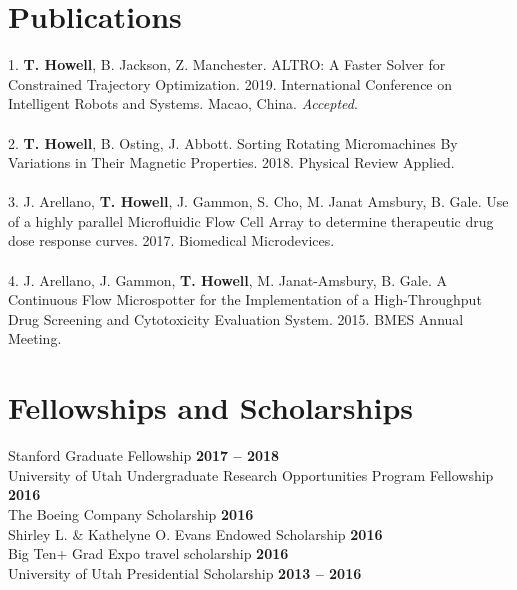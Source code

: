 \documentclass[margin,line]{res}
\begin{document}
\begin{resume}
\section{\sc Publications}
1. \textbf{T. Howell}, B. Jackson, Z. Manchester. ALTRO: A Faster Solver for Constrained Trajectory Optimization. 2019. International Conference on Intelligent Robots and Systems. Macao, China. \textit{Accepted}.\\
\\
2. \textbf{T. Howell}, B. Osting, J. Abbott. Sorting Rotating Micromachines By Variations in Their Magnetic
Properties. 2018. Physical Review Applied.\\
\\
3. J. Arellano, \textbf{T. Howell}, J. Gammon, S. Cho, M. Janat Amsbury, B. Gale. Use of a highly parallel
Microfluidic Flow Cell Array to determine therapeutic drug dose response curves. 2017. Biomedical
Microdevices.\\
\\
4. J. Arellano, J. Gammon, \textbf{T. Howell}, M. Janat-Amsbury, B. Gale. A Continuous Flow Microspotter for
the Implementation of a High-Throughput Drug Screening and Cytotoxicity Evaluation System.
2015. BMES Annual Meeting.

\section{\sc Fellowships and Scholarships}
 Stanford Graduate Fellowship \hfill {\bf 2017 – 2018}\\
University of Utah Undergraduate Research Opportunities Program Fellowship \hfill {\bf 2016}\\
The Boeing Company Scholarship \hfill {\bf 2016}\\
Shirley L. \& Kathelyne O. Evans Endowed Scholarship \hfill {\bf 2016}\\
Big Ten+ Grad Expo travel scholarship \hfill {\bf 2016}\\
University of Utah Presidential Scholarship \hfill {\bf 2013 – 2016}
\\


\end{resume}
\end{document}
